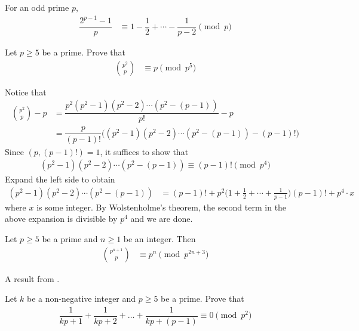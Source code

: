 \documentclass[12pt]{subfile}
\begin{document}
		\begin{corollary}
			For an odd prime $p$,
				\begin{align*}
					\dfrac{2^{p-1}-1}{p}
						& \equiv1-\dfrac{1}{2}+\cdots-\dfrac{1}{p-2}\pmod p
				\end{align*}
		\end{corollary}

		\begin{problem}
			Let $p \geq 5$ be a prime. Prove that
				\begin{align*}
					\binom{p^2}{p}
						& \equiv p \pmod{p^5}
				\end{align*}
		\end{problem}

		\begin{solution}
			Notice that
				\begin{align*}
					\binom{p^2}{p} - p
						& =\dfrac{p^2(p^2-1)(p^2-2)\cdots(p^2-(p-1))}{p!}-p\\
						& =\dfrac{p}{(p-1)!} \Big((p^2-1)(p^2-2)\cdots(p^2-(p-1)) - (p-1)!\Big)
				\end{align*}
			Since $(p, (p-1)!)=1$, it suffices to show that
				\begin{align*}
					(p^2-1)(p^2-2)\cdots(p^2-(p-1)) \equiv (p-1)! \pmod{p^4}
				\end{align*}
			Expand the left side to obtain
				\begin{align*}
					(p^2-1)(p^2-2)\cdots(p^2-(p-1))
						& = (p-1)! + p^2\Big(1+\frac{1}{2}+\cdots+\frac{1}{p-1}\Big)\left(p-1\right)!+p^4\cdot x
				\end{align*}
			where $x$ is some integer. By Wolstenholme's theorem, the second term in the above expansion is divisible by $p^4$ and we are done.
		\end{solution}

		\begin{corollary}
			Let $p \geq 5$ be a prime and $n\geq 1$ be an integer. Then
				\begin{align*}
					\binom{p^{n+1}}{p}
						& \equiv p^n \pmod{p^{2n+3}}
				\end{align*}
		\end{corollary}
	A result from \textcite{carlitz_1954}.
		\begin{problem}
			Let $k$ be a non-negative integer and $p\geq 5$ be a prime. Prove that
				\begin{align*}
					\dfrac{1}{kp+1}+ \dfrac{1}{kp+2}+ \ldots+\dfrac{1}{kp+(p-1)}\equiv 0\pmod{p^2}
				\end{align*}
		\end{problem}
\end{document}
